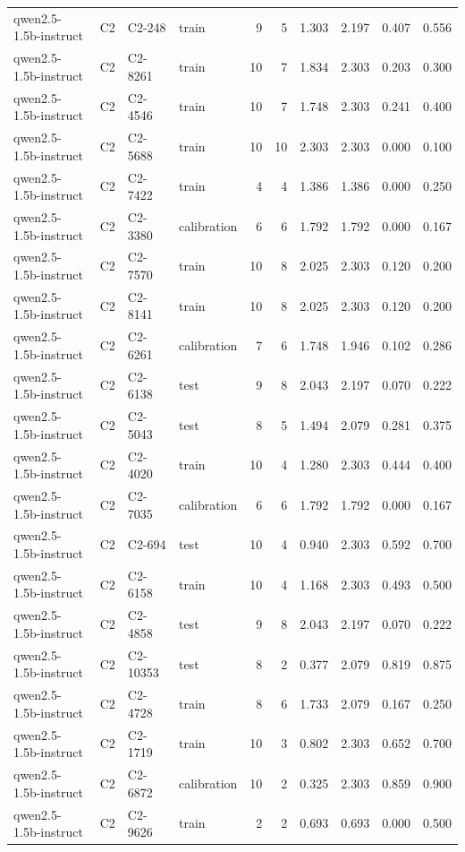 \begin{table}
\begin{tabular}{llllrrrrrr}
qwen2.5-1.5b-instruct & C2 & C2-248 & train & 9 & 5 & 1.303 & 2.197 & 0.407 & 0.556 \\
qwen2.5-1.5b-instruct & C2 & C2-8261 & train & 10 & 7 & 1.834 & 2.303 & 0.203 & 0.300 \\
qwen2.5-1.5b-instruct & C2 & C2-4546 & train & 10 & 7 & 1.748 & 2.303 & 0.241 & 0.400 \\
qwen2.5-1.5b-instruct & C2 & C2-5688 & train & 10 & 10 & 2.303 & 2.303 & 0.000 & 0.100 \\
qwen2.5-1.5b-instruct & C2 & C2-7422 & train & 4 & 4 & 1.386 & 1.386 & 0.000 & 0.250 \\
qwen2.5-1.5b-instruct & C2 & C2-3380 & calibration & 6 & 6 & 1.792 & 1.792 & 0.000 & 0.167 \\
qwen2.5-1.5b-instruct & C2 & C2-7570 & train & 10 & 8 & 2.025 & 2.303 & 0.120 & 0.200 \\
qwen2.5-1.5b-instruct & C2 & C2-8141 & train & 10 & 8 & 2.025 & 2.303 & 0.120 & 0.200 \\
qwen2.5-1.5b-instruct & C2 & C2-6261 & calibration & 7 & 6 & 1.748 & 1.946 & 0.102 & 0.286 \\
qwen2.5-1.5b-instruct & C2 & C2-6138 & test & 9 & 8 & 2.043 & 2.197 & 0.070 & 0.222 \\
qwen2.5-1.5b-instruct & C2 & C2-5043 & test & 8 & 5 & 1.494 & 2.079 & 0.281 & 0.375 \\
qwen2.5-1.5b-instruct & C2 & C2-4020 & train & 10 & 4 & 1.280 & 2.303 & 0.444 & 0.400 \\
qwen2.5-1.5b-instruct & C2 & C2-7035 & calibration & 6 & 6 & 1.792 & 1.792 & 0.000 & 0.167 \\
qwen2.5-1.5b-instruct & C2 & C2-694 & test & 10 & 4 & 0.940 & 2.303 & 0.592 & 0.700 \\
qwen2.5-1.5b-instruct & C2 & C2-6158 & train & 10 & 4 & 1.168 & 2.303 & 0.493 & 0.500 \\
qwen2.5-1.5b-instruct & C2 & C2-4858 & test & 9 & 8 & 2.043 & 2.197 & 0.070 & 0.222 \\
qwen2.5-1.5b-instruct & C2 & C2-10353 & test & 8 & 2 & 0.377 & 2.079 & 0.819 & 0.875 \\
qwen2.5-1.5b-instruct & C2 & C2-4728 & train & 8 & 6 & 1.733 & 2.079 & 0.167 & 0.250 \\
qwen2.5-1.5b-instruct & C2 & C2-1719 & train & 10 & 3 & 0.802 & 2.303 & 0.652 & 0.700 \\
qwen2.5-1.5b-instruct & C2 & C2-6872 & calibration & 10 & 2 & 0.325 & 2.303 & 0.859 & 0.900 \\
qwen2.5-1.5b-instruct & C2 & C2-9626 & train & 2 & 2 & 0.693 & 0.693 & 0.000 & 0.500 \\

\end{tabular}
\end{table}
